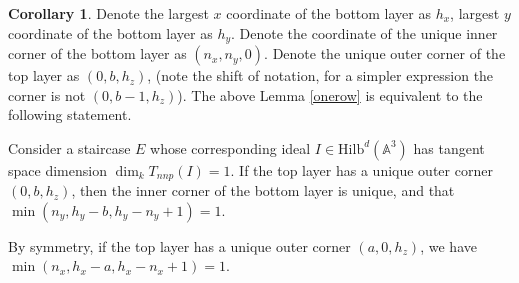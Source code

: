 \documentclass{amsart}[10pt]
\theoremstyle{plain}
\theoremstyle{definition}
\newtheorem{corollary}[theorem]{Corollary}
\newcommand{\Hilb}{\mathrm{Hilb}}
\begin{document}
\begin{corollary}
\label{equiv_cond_onerow}
Denote the largest $x$ coordinate of the bottom layer as $h_x$, largest $y$ coordinate of the bottom layer as $h_y$. Denote the coordinate of the unique inner corner of the bottom layer as $(n_x,n_y,0)$. Denote the unique outer corner of the top layer as $(0, b, h_z)$, (note the shift of notation, for a simpler expression the corner is not $(0, b-1, h_z)$). The above Lemma \ref{onerow} is equivalent to the following statement. 

Consider a staircase $E$ whose corresponding ideal $I \in \Hilb^d(\mathbb{A}^3)$ has tangent space dimension $\dim_k T_{nnp}(I)=1$. If the top layer has a unique outer corner $(0, b, h_z)$, then the inner corner of the bottom layer is unique, and that $\min(n_y,h_y-b, h_y-n_y+1)=1$. 

By symmetry, if the top layer has a unique outer corner $(a, 0, h_z)$, we have $\min(n_x,h_x-a, h_x-n_x+1)=1$.   
\end{corollary}
\end{document}
